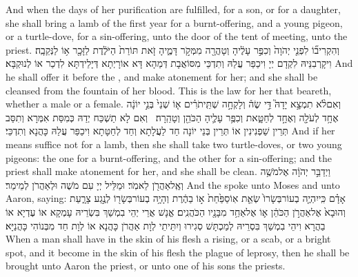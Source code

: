 {And when the days of her purification are fulfilled, for a son, or for a daughter, she shall bring a lamb of the first year for a burnt-offering, and a young pigeon, or a turtle-dove, for a sin-offering, unto the door of the tent of meeting, unto the priest.}{}
{וְהִקְרִיב֞וֹ לִפְנֵ֤י יְהֹוָה֙ וְכִפֶּ֣ר עָלֶ֔יהָ וְטָהֲרָ֖ה מִמְּקֹ֣ר דָּמֶ֑יהָ זֹ֤את תּוֹרַת֙ הַיֹּלֶ֔דֶת לַזָּכָ֖ר א֥וֹ לַנְּקֵבָֽה׃}
{וִיקָרְבִנֵּיהּ לִקְדָם יְיָ וִיכַפַּר עֲלַהּ וְתִדְכֵּי מִסּוֹאֲבָת דְּמַהָא דָּא אוֹרָיְתָא דְּיָלֵידְתָּא לִדְכַר אוֹ לְנוּקְבָּא׃}
{And he shall offer it before the \lord, and make atonement for her; and she shall be cleansed from the fountain of her blood. This is the law for her that beareth, whether a male or a female.}{}
{וְאִם\maqqaf לֹ֨א תִמְצָ֣א יָדָהּ֮ דֵּ֣י שֶׂה֒ וְלָקְחָ֣ה שְׁתֵּֽי\maqqaf תֹרִ֗ים א֤וֹ שְׁנֵי֙ בְּנֵ֣י יוֹנָ֔ה אֶחָ֥ד לְעֹלָ֖ה וְאֶחָ֣ד לְחַטָּ֑את וְכִפֶּ֥ר עָלֶ֛יהָ הַכֹּהֵ֖ן וְטָהֵֽרָה׃ \petucha }
{וְאִם לָא תַשְׁכַּח יְדַהּ כְּמִסַּת אִמְּרָא וְתִסַּב ‏‏תְּרֵין שַׁפְנִינִין אוֹ תְּרֵין בְּנֵי יוֹנָה חַד לַעֲלָתָא וְחַד לְחַטָּתָא וִיכַפַּר עֲלַהּ כָּהֲנָא וְתִדְכֵּי׃}
{And if her means suffice not for a lamb, then she shall take two turtle-doves, or two young pigeons: the one for a burnt-offering, and the other for a sin-offering; and the priest shall make atonement for her, and she shall be clean.}{}
\newperek
{}%
{וַיְדַבֵּ֣ר יְהֹוָ֔ה אֶל\maqqaf מֹשֶׁ֥ה וְאֶֽל\maqqaf אַהֲרֹ֖ן לֵאמֹֽר׃}
{וּמַלֵּיל יְיָ עִם מֹשֶׁה וּלְאַהֲרֹן לְמֵימַר׃}
{And the \lord\space spoke unto Moses and unto Aaron, saying:}{}
{אָדָ֗ם כִּֽי\maqqaf יִהְיֶ֤ה בְעוֹר\maqqaf בְּשָׂרוֹ֙ שְׂאֵ֤ת אֽוֹ\maqqaf סַפַּ֙חַת֙ א֣וֹ בַהֶ֔רֶת וְהָיָ֥ה בְעוֹר\maqqaf בְּשָׂר֖וֹ לְנֶ֣גַע צָרָ֑עַת וְהוּבָא֙ אֶל\maqqaf אַהֲרֹ֣ן הַכֹּהֵ֔ן א֛וֹ אֶל\maqqaf אַחַ֥ד מִבָּנָ֖יו הַכֹּהֲנִֽים׃}
{אֱנָשׁ אֲרֵי יְהֵי בִמְשַׁךְ בִּשְׂרֵיהּ עָמְקָא אוֹ עֶדְיָא אוֹ בַהֲרָא וִיהֵי בִמְשַׁךְ בִּסְרֵיהּ לְמַכְתָּשׁ סְגִירוּ וְיִתֵּיתֵי לְוָת אַהֲרֹן כָּהֲנָא אוֹ לְוָת חַד מִבְּנוֹהִי כָּהֲנַיָּא׃}
{When a man shall have in the skin of his flesh a rising, or a scab, or a bright spot, and it become in the skin of his flesh the plague of leprosy, then he shall be brought unto Aaron the priest, or unto one of his sons the priests.}{}

